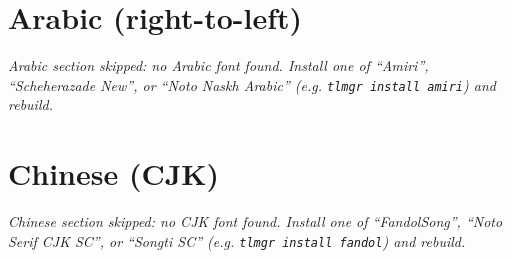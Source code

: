 \documentclass[11pt,a4paper]{article}
\newif\ifhasarabic
\newif\ifhascjk
\begin{document}
\section*{Arabic (right-to-left)}
\ifhasarabic
\begin{Arabic}
مرحبًا بالعالم. هذا نصٌّ تجريبيٌّ مكتوبٌ باللغة العربية، ويُكتب من اليمين إلى
اليسار. لاحظ كيف تتشابك الحروف وتتغيّر أشكالها حسب موضعها في الكلمة.
\end{Arabic}
\else
\textit{Arabic section skipped: no Arabic font found. Install one of
``Amiri'', ``Scheherazade New'', or ``Noto Naskh Arabic'' (e.g.
\texttt{tlmgr install amiri}) and rebuild.}
\fi

\section*{Chinese (CJK)}
\ifhascjk
你好，世界。这是一段用中文书写的示例文字。中文不使用空格来分隔词语，
因此换行需要 xeCJK 在字符之间进行处理。汉字与拉丁字母可以混排。
\else
\textit{Chinese section skipped: no CJK font found. Install one of
``FandolSong'', ``Noto Serif CJK SC'', or ``Songti SC'' (e.g.
\texttt{tlmgr install fandol}) and rebuild.}
\fi
\end{document}
